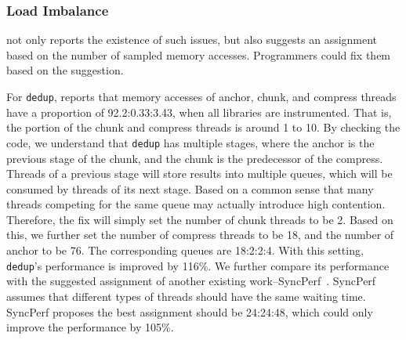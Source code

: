 

\subsubsection{Load Imbalance}

\NP{} not only reports the existence of such issues, but also suggests an assignment based on the number of sampled memory accesses. Programmers could fix them based on the suggestion. 

For \texttt{dedup}, \NP{} reports that memory accesses of anchor, chunk, and compress threads have a proportion of 92.2:0.33:3.43, when all libraries are instrumented. That is, the portion of the chunk and compress threads is around 1 to 10. By checking the code, we understand that \texttt{dedup} has multiple stages, where the anchor is the previous stage of the chunk, and the chunk is the predecessor of the compress. Threads of a previous stage will store results into multiple queues, which will be consumed by threads of its next stage. Based on a common sense that many threads competing for the same queue may actually introduce high contention. Therefore, the fix will simply set the number of chunk threads to be 2. Based on this, we further set the number of compress threads to be 18, and the number of anchor to be 76. The corresponding queues are 18:2:2:4. With this setting, \texttt{dedup}'s performance is improved by 116\%. We further compare its performance with the suggested assignment of another existing work--SyncPerf~\cite{SyncPerf}. SyncPerf assumes that different types of threads should have the same waiting time. SyncPerf proposes the best assignment should be 24:24:48, which could only improve the performance by 105\%. 

